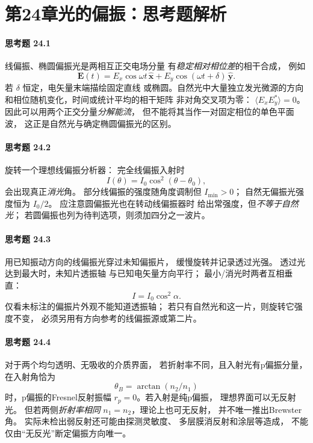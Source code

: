 \section*{第24章\quad 光的偏振：思考题解析}
\paragraph{思考题 24.1}
线偏振、椭圆偏振光是两相互正交电场分量
有\emph{稳定相对相位差}的相干合成，
例如
\[
\boldsymbol E(t)=
E_x\cos\omega t\,\hat{\boldsymbol x}
+E_y\cos(\omega t+\delta)\,\hat{\boldsymbol y}.
\]
若 \(\delta\) 恒定，电矢量末端描绘固定直线
或椭圆。自然光中大量独立发光微源的方向
和相位随机变化，时间或统计平均的相干矩阵
非对角交叉项为零：
\(\langle E_xE_y^*\rangle=0\)。
因此可以用两个正交分量\emph{分解能流}，
但不能将其当作一对固定相位的单色平面波，
这正是自然光与确定椭圆偏振光的区别。

\paragraph{思考题 24.2}
旋转一个理想线偏振分析器：
完全线偏振入射时
\[
\boxed{I(\theta)=I_0\cos^2(\theta-\theta_0)},
\]
会出现真正\emph{消光}角。
部分线偏振的强度随角度调制但
\(I_{\min}>0\)；
自然无偏振光强度恒为
\(\boxed{I_0/2}\)。
应注意圆偏振光也在转动线偏振器时
给出常强度，但\emph{不等于自然光}；
若圆偏振也列为待判选项，则须加四分之一波片。

\paragraph{思考题 24.3}
用已知振动方向的线偏振光穿过未知偏振片，
缓慢旋转并记录透过光强。
透过光达到最大时，未知片透振轴
与已知电矢量方向平行；
最小/消光时两者互相垂直：
\[
\boxed{I=I_0\cos^2\alpha}.
\]
仅看未标注的偏振片外观不能知道透振轴；
若只有自然光和这一片，则旋转它强度不变，
必须另用有方向参考的线偏振源或第二片。

\paragraph{思考题 24.4}
对于两个均匀透明、无吸收的介质界面，
若折射率不同，且入射光有p偏振分量，
在入射角恰为
\[
\boxed{\theta_B=\arctan(n_2/n_1)}
\]
时，p偏振的Fresnel反射振幅
\(r_p=0\)。若入射是纯p偏振，
理想界面可以无反射光。
但若两侧\emph{折射率相同}
\(n_1=n_2\)，理论上也可无反射，
并不唯一推出Brewster角。
实际未检出弱反射还可能由探测灵敏度、
多层膜消反射和涂层等造成，
不能仅由“无反光”断定偏振方向唯一。

